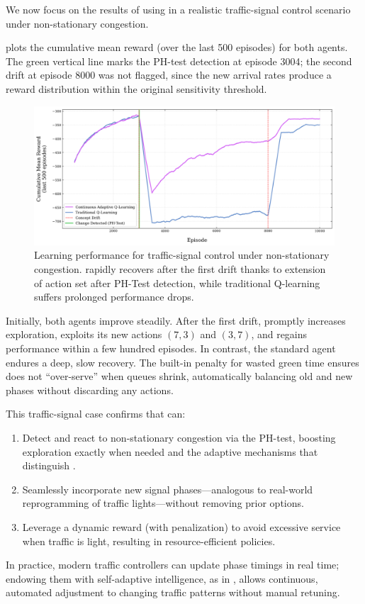 We now focus on the results of using \adaptiverl in a realistic traffic-signal control scenario under non-stationary congestion.  

 plots the cumulative mean reward (over the last 500 episodes) for both agents. The green vertical line marks the PH-test detection at episode 3004; the second drift at episode 8000 was not flagged, since the new arrival rates produce a reward distribution within the original sensitivity threshold.

\begin{figure}
    \centering
    \includegraphics[width=\textwidth]{figures/traffic_learning_curve}
    \caption{Learning performance for traffic-signal control under non-stationary congestion. \adaptiverl rapidly recovers after the first drift thanks to extension of action set after PH-Test detection, while traditional Q-learning suffers prolonged performance drops.}
    \label{fig:traffic-learning-curve}
\end{figure}

Initially, both agents improve steadily. After the first drift, \adaptiverl promptly increases exploration, exploits its new actions $(7,3)$ and $(3,7)$, and regains performance within a few hundred episodes. In contrast, the standard agent endures a deep, slow recovery. The built-in penalty for wasted green time ensures \adaptiverl does not “over-serve” when queues shrink, automatically balancing old and new phases without discarding any actions.

This traffic-signal case confirms that \adaptiverl can:
\begin{enumerate}
  \item Detect and react to non-stationary congestion via the PH-test, boosting exploration exactly when needed and the adaptive mechanisms that distinguish \adaptiverl.
  \item Seamlessly incorporate new signal phases---analogous to real-world reprogramming of traffic lights---without removing prior options.
  \item Leverage a dynamic reward (with penalization) to avoid excessive service when traffic is light, resulting in resource-efficient policies.
\end{enumerate}
In practice, modern traffic controllers can update phase timings in real time; endowing them with self-adaptive intelligence, as in \adaptiverl, allows continuous, automated adjustment to changing traffic patterns without manual retuning.


\endinput


